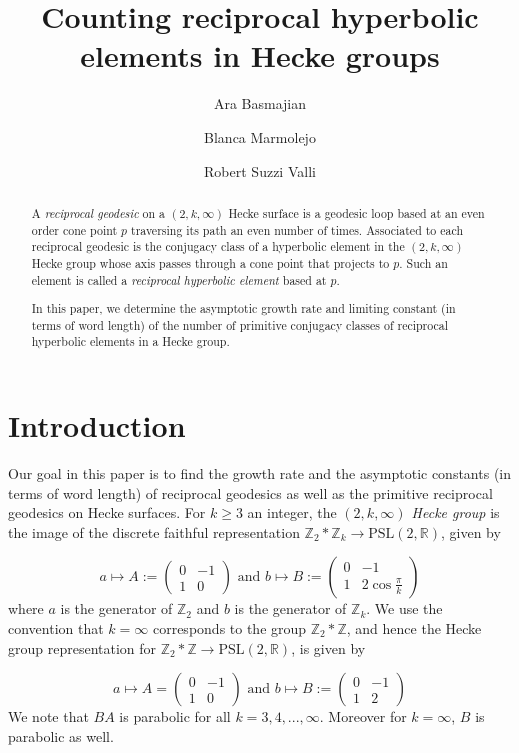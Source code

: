 \documentclass[11pt]{amsart}
\title{Counting reciprocal hyperbolic elements   in Hecke groups}
\author{Ara Basmajian}
\author{Blanca Marmolejo}
\author{Robert Suzzi Valli}
\numberwithin{equation}{section}
\theoremstyle{plain}
\begin{document}
\begin{abstract}  A {\it reciprocal geodesic}  on a $(2,k, \infty)$ Hecke surface is  a geodesic loop based  at an even order cone point $p$  traversing its path an even number of times. Associated to each reciprocal geodesic is the conjugacy class of a  hyperbolic element in the 
$(2,k,\infty)$ Hecke group whose axis  passes through a cone point that projects to $p$. Such an element is called a 
{\it reciprocal hyperbolic element}  based at $p$.

 In this paper,  we  determine the asymptotic growth rate and limiting constant 
(in terms of word length) of the number of  primitive conjugacy classes of  reciprocal  hyperbolic elements in  a Hecke group.   
\end{abstract}
\maketitle


\section{Introduction}



Our goal in this paper  is to find the  growth rate and the asymptotic constants (in terms of word length) of  reciprocal geodesics as well as the primitive reciprocal geodesics on  Hecke surfaces.  For $k \geq 3$ an integer, the 
{\it $(2,k, \infty)$  Hecke group} 
is  the image of the  discrete faithful representation  
$\mathbb{Z}_2 \ast \mathbb{Z}_k \rightarrow \textrm{PSL}(2,\mathbb{R})$, given by 

$$
a \mapsto A:=\begin{pmatrix} 
     0 & -1   \\
     1 & 0 
\end{pmatrix} \text{ and  } b \mapsto B :=\begin{pmatrix} 
     0 & -1    \\
     1 & 2\cos \frac{\pi}{k}
\end{pmatrix}
$$
where $a$ 
is  the generator of $\mathbb{Z}_{2}$  and $b$ is the generator of  
$\mathbb{Z}_k$.  We use the convention that $k=\infty$ corresponds to the group  $\mathbb{Z}_2 \ast \mathbb{Z}$, and hence  the   Hecke group representation  for 
$\mathbb{Z}_2 \ast \mathbb{Z}  \rightarrow \textrm{PSL}(2,\mathbb{R})$, is given by 

$$
a \mapsto A=\begin{pmatrix} 
     0 & -1   \\
     1 & 0 
\end{pmatrix} \text{ and  } b \mapsto B:=\begin{pmatrix} 
     0 & -1    \\
     1 & 2
\end{pmatrix}
$$
We note that $BA$ is parabolic for all $k=3,4,...,\infty$. Moreover for $k=\infty$, $B$ is parabolic as well. 
\end{document}
